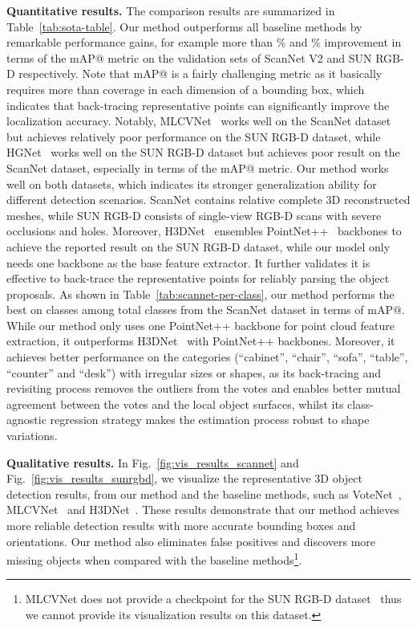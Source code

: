 \documentclass[final]{cvpr}
\begin{document}
\vspace{+1mm}
\noindent\textbf{Quantitative results.}
The comparison results are summarized in Table~\ref{tab:sota-table}.
Our method outperforms all baseline methods by remarkable performance gains, for example more than \% and \% improvement in terms of the mAP@ metric on the validation sets of ScanNet V2 and SUN RGB-D respectively.
Note that mAP@ is a fairly challenging metric as it basically requires more than  coverage in each dimension of a bounding box, which indicates that back-tracing representative points can  significantly improve the localization accuracy.
Notably, MLCVNet~\cite{mlcvnet} works well on the ScanNet dataset but achieves relatively poor performance on the SUN RGB-D dataset, while HGNet~\cite{hgnet} works well on the SUN RGB-D dataset but achieves poor result on the ScanNet dataset, especially in terms of the mAP@ metric.
Our method works well on both datasets, which indicates its stronger generalization ability for different detection scenarios. 
ScanNet contains relative complete 3D reconstructed meshes, while SUN RGB-D consists of single-view RGB-D scans with severe occlusions and holes.
Moreover, H3DNet~\cite{h3dnet} ensembles  PointNet++~\cite{qi2017pointnet++} backbones to achieve the reported result on the SUN RGB-D dataset, while our model only needs one backbone as the base feature extractor.
It further validates it is effective to back-trace the representative points for reliably parsing the object proposals.
As shown in Table~\ref{tab:scannet-per-class}, our method performs the best on  classes among  total classes from the ScanNet dataset in terms of mAP@.
While our method only uses one PointNet++ backbone for point cloud feature extraction, it outperforms H3DNet~\cite{h3dnet} with  PointNet++ backbones.
Moreover, it achieves better performance on the categories (\eg ``cabinet'', ``chair'', ``sofa'', ``table'', ``counter'' and ``desk'') with irregular sizes or shapes, as its back-tracing and revisiting process removes the outliers from the votes and enables better mutual agreement between the votes and the local object surfaces, whilst its class-agnostic regression strategy makes the estimation process robust to shape variations.

\vspace{+1mm}
\noindent\textbf{Qualitative results.}
In Fig.~\ref{fig:vis_results_scannet} and Fig.~\ref{fig:vis_results_sunrgbd}, we visualize the representative 3D object detection results, from our method and the baseline methods, such as VoteNet~\cite{votenet}, MLCVNet~\cite{mlcvnet} and H3DNet~\cite{h3dnet}.
These results demonstrate that our method achieves more reliable detection results with more accurate bounding boxes and orientations. Our method also eliminates false positives and discovers more missing objects when compared with the baseline methods\footnote{MLCVNet does not provide a checkpoint for the SUN RGB-D dataset~\cite{sunrgb-d} thus we cannot provide its visualization results on this dataset.}.
\end{document}
